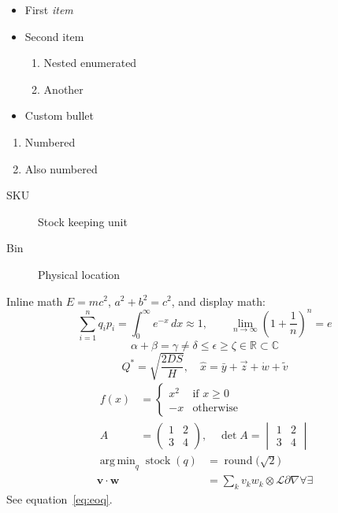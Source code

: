 \documentclass[11pt,a4paper,twoside]{article}
\DeclareMathOperator{\stock}{stock}
\DeclareMathOperator*{\argmin}{arg\,min}
\theoremstyle{definition}
\begin{document}
\begin{itemize}
  \item First \emph{item}
  \item Second item
    \begin{enumerate}[label=\alph*)]
      \item Nested enumerated
      \item Another
    \end{enumerate}
  \item[$\star$] Custom bullet
\end{itemize}
\begin{enumerate}
  \item Numbered \label{item:one}
  \item Also numbered
\end{enumerate}
\begin{description}
  \item[SKU] Stock keeping unit
  \item[Bin] Physical location
\end{description}

Inline math $E = mc^2$, \(a^2 + b^2 = c^2\), and display math:
\[
  \sum_{i=1}^{n} q_i p_i = \int_0^\infty e^{-x}\,dx \approx 1, \qquad
  \lim_{n \to \infty} \left( 1 + \frac{1}{n} \right)^n = e
\]
$$ \alpha + \beta = \gamma \neq \delta \leq \epsilon \geq \zeta \in \mathbb{R} \subset \mathbb{C} $$
\begin{equation}\label{eq:eoq}
  Q^* = \sqrt{\frac{2DS}{H}}, \quad \hat{x} = \bar{y} + \vec{z} + \dot{w} + \tilde{v}
\end{equation}
\begin{align}
  f(x) &= \begin{cases} x^2 & \text{if } x \ge 0 \\ -x & \text{otherwise} \end{cases} \\
  A &= \begin{pmatrix} 1 & 2 \\ 3 & 4 \end{pmatrix}, \quad \det A = \begin{vmatrix} 1 & 2 \\ 3 & 4 \end{vmatrix} \nonumber
\end{align}
\begin{align*}
  \argmin_{q} \stock(q) &= \operatorname{round}\bigl(\sqrt{2}\bigr) \\
  \mathbf{v} \cdot \mathbf{w} &= \sum\nolimits_k v_k w_k \otimes \mathcal{L} \partial \nabla \forall \exists
\end{align*}
See equation~\eqref{eq:eoq}.
\end{document}
